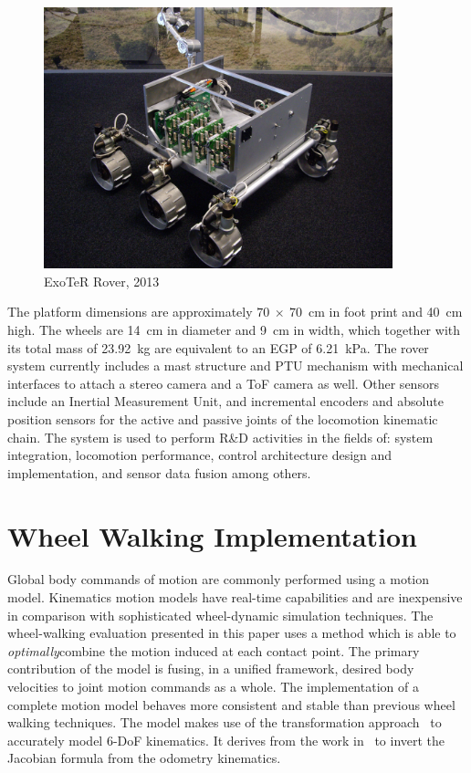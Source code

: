 \documentclass[a4paper,twocolumn]{esapub2005} %
\begin{document}
\begin{figure}[h!]
    \centering
    \includegraphics[width=0.9\textwidth]{ExoterRover2013.jpg}
    \caption{ExoTeR Rover, 2013}
    \label{fig:volley}
\end{figure}

The platform dimensions are approximately $70~\times~70$~\unit{cm} in foot
print and 40~\unit{cm} high.  The wheels are 14~\unit{cm} in diameter and
9~\unit{cm} in width, which together with its total mass of 23.92~\unit{kg}
are equivalent to an EGP of 6.21~\unit{kPa}. The rover system currently
includes a mast structure and PTU mechanism with mechanical interfaces to
attach a stereo camera and a ToF camera as well. Other sensors include an
Inertial Measurement Unit, and incremental encoders and absolute position
sensors for the active and passive joints of the locomotion kinematic chain.
The system is used to perform R\&D activities in the fields of: system
integration, locomotion performance, control architecture design and
implementation, and sensor data fusion among others. 

\section{Wheel Walking Implementation}

Global body commands of motion are commonly performed using a motion model.
Kinematics motion models have real-time capabilities and are inexpensive in
comparison with sophisticated wheel-dynamic simulation techniques.  The
wheel-walking evaluation presented in this paper uses a method which is able to
\textit{optimally}\footnotemark[2] combine the motion induced at each contact
point. The primary contribution of the model is fusing, in a unified framework,
desired body velocities to joint motion commands as a whole.  The
implementation of a complete motion model behaves more consistent and stable
than previous wheel walking techniques. The model makes use of the
transformation approach~\cite{Tarokh2005} to accurately model 6-DoF kinematics.
It derives from the work in~\cite{Hidalgo-Carrio2014} to invert the Jacobian
formula from the odometry kinematics.
\end{document}
